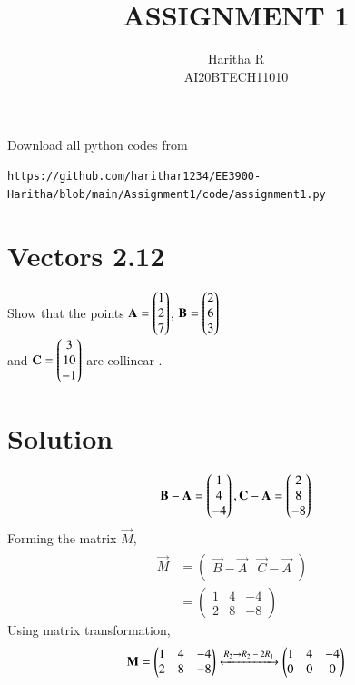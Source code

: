 \documentclass[journal,12pt,twocolumn]{IEEEtran}
\begin{document}
     \def\centbox#1{\makebox[0in]{#1}}
     \def\topbox#1{\raisebox{-\baselineskip}[0in][0in]{#1}}
     \def\midbox#1{\raisebox{-0.5\baselineskip}[0in][0in]{#1}}
\vspace{3cm}
\title{ASSIGNMENT 1}
\author{Haritha R\\ AI20BTECH11010}
\maketitle
\newpage
\bigskip
\renewcommand{\thefigure}{\theenumi}
\renewcommand{\thetable}{\theenumi}
Download all python codes from 
\begin{lstlisting}
https://github.com/harithar1234/EE3900-Haritha/blob/main/Assignment1/code/assignment1.py
\end{lstlisting}

%
\section{Vectors 2.12}
Show that the points $\vec{A} = \myvec{1\\2\\7}$, $\vec{B}=\myvec{2\\6\\3}$ \\ and $\vec{C}=\myvec{3\\10\\-1}$ are collinear .
\section{Solution}
\begin{equation}
    \vec{B} - \vec{A} = \myvec{1\\4\\-4}, \vec{C} - \vec{A} = \myvec{2\\8\\-8}
\end{equation}
Forming the matrix $\vec{M}$,
\begin{align}
   \vec{M}&= \begin{pmatrix}
    \vec{B} - \vec{A} & \vec{C} - \vec{A}\\
    \end{pmatrix}^\top\\
    &= \begin{pmatrix}
    1 & 4 & -4\\
    2 & 8 & -8
    \end{pmatrix}
\end{align}
Using matrix transformation,
\begin{align}
 \vec{M} = \begin{pmatrix}
    1 & 4 & -4\\
    2 & 8 & -8
    \end{pmatrix} \xleftrightarrow{\text{$R_2$}\rightarrow{\text{$R_2 - {2} R_1$ }}}
 \begin{pmatrix}
 1 & 4 & -4\\
 0 & 0 & 0
 \end{pmatrix}
\end{align}
 
\end{document}
